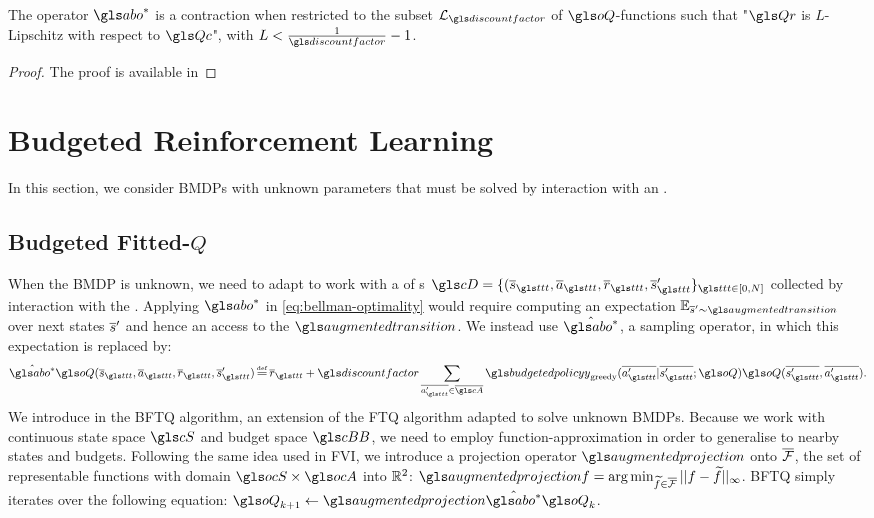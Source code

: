 \begin{theorem}
    \label{thm:contractivity-smooth}
    The operator $\abo^{*}$ is a contraction when restricted to the subset $\cL_{\discountfactor}$ of $\oQ$-functions such that "$\Qr$ is $L$-Lipschitz with respect to $\Qc$", with $L<\frac{1}{\discountfactor}-1$.
\end{theorem}

\begin{proof}
    The proof is available in 
\end{proof}

\section{Budgeted Reinforcement Learning}
\label{sec:brl}

In this section, we consider \glspl{BMDP} with unknown parameters that must be solved by interaction with an .

\subsection{Budgeted Fitted-$Q$}
\label{subsec:bftq}

When the \gls{BMDP} is unknown, we need to adapt  to work with a  of s $\cD=\{(\os_{\indextransition},\oa_{\indextransition},\overline{r}_{\indextransition},\os_{\indextransition}'\}_{{\indextransition}\in [0,N]}$ collected by interaction with the . Applying $\abo^{*}$ in \eqref{eq:bellman-optimality} would require computing an expectation $\expectedvalue_{\os'\sim \augmentedtransition}$ over next states $\overline{s}'$ and hence an access to the  $\augmentedtransition$. We instead use $\hat{\abo^{*}}$, a sampling operator, in which this expectation is replaced by:
\begin{equation*}
    \hat{\abo^{*}} \oQ(\os_{\indextransition}, \oa_{\indextransition}, \overline{r}_{\indextransition}, \os'_{\indextransition}) \eqdef \overline{r}_{\indextransition} + \discountfactor \sum_{\ov{a'_{\indextransition}}\in \ov{\cA}} \budgetedpolicy_\text{greedy}(\ov{a'_{\indextransition}}|\ov{s'_{\indextransition}}; \oQ) \oQ(\ov{s'_{\indextransition}}, \ov{a'_{\indextransition}}).
\end{equation*}
We introduce in  the \gls{BFTQ} algorithm, an extension of the \gls{FTQ} algorithm adapted to solve unknown \glspl{BMDP}. Because we work with continuous state space $\cS$ and budget space $\budgetspace$, we need to employ function-approximation in order to generalise to nearby states and budgets. Following the same idea used in \gls{FVI}, we introduce a projection operator $\augmentedprojection$ onto $\overline{\mathcal{F}}$, the set of representable functions with domain $\ocS\times\ocA$ into $\mathbb{R}^2$: $\augmentedprojection f = \argmin_{\tilde{f}\in \ocF} || f - \tilde{f} ||_{\infty}$. \gls{BFTQ} simply iterates over the following equation: $\oQ_{k+1} \leftarrow \augmentedprojection\hat{\abo^{*}} \oQ_k$.

